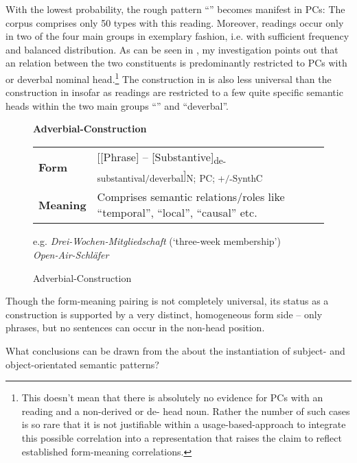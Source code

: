\documentclass[output=paper]{LSP/langsci}
\begin{document}
With the lowest probability, the rough pattern ``'' becomes manifest in PCs:  The corpus comprises only 50 types with this reading. Moreover,  readings occur only in two of the four main groups in exemplary fashion, i.e. with sufficient frequency and balanced distribution. As can be seen in , my investigation points out that an  relation between the two constituents is predominantly restricted to PCs with  or deverbal nominal head.\footnote{This doesn’t mean that there is absolutely no evidence for PCs with an  reading and a non-derived or de- head noun. Rather the number of such cases is so rare that it is not justifiable within a usage-based-approach to integrate this possible correlation into a representation that raises the claim to reflect established form-meaning correlations.}  The construction in  is also less universal than the construction in  insofar as  readings are restricted to a few quite specific semantic heads within the two main groups ``'' and ``deverbal''.

\begin{figure}
\caption{Adverbial-Construction\label{fig:hein:1.6}}
\begin{framed}\raggedright
\textbf{Adverbial-Construction}\\[1.5\baselineskip]
\begin{tabularx}{\linewidth}{lX}
\textbf{Form} & [[Phrase] -- [Substantive]\textsubscript{de-substantival/deverbal}]\textsubscript{N;} \textsubscript{PC; +/-SynthC}\\
\textbf{Meaning} & Comprises semantic relations/roles like ``temporal'', ``local'', ``causal'' etc.\\
\end{tabularx}
\vspace{\baselineskip}\par
e.g. \textit{Drei-Wochen-Mitgliedschaft} (‘three-week membership’)\\
\textit{Open-Air-Schläfer}
\end{framed}
\end{figure}

Though the form-meaning pairing is not completely universal, its status as a construction is supported by a very distinct, homogeneous form side -- only phrases, but no sentences can occur in the non-head position. 

What conclusions can be drawn from the  about the instantiation of subject- and object-orientated semantic patterns? 
\end{document}
